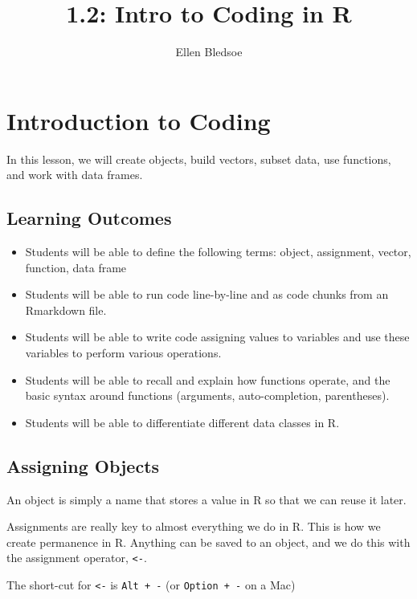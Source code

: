 \documentclass[
  letterpaper,
  DIV=11,
  numbers=noendperiod]{scrartcl}
\title{1.2: Intro to Coding in R}
\author{Ellen Bledsoe}
\date{}
\providecommand{\tightlist}{%
  \setlength{\itemsep}{0pt}\setlength{\parskip}{0pt}}
\begin{document}
\maketitle


\section{Introduction to Coding}\label{introduction-to-coding}

In this lesson, we will create objects, build vectors, subset data, use
functions, and work with data frames.

\subsection{Learning Outcomes}\label{learning-outcomes}

\begin{itemize}
\tightlist
\item
  Students will be able to define the following terms: object,
  assignment, vector, function, data frame
\item
  Students will be able to run code line-by-line and as code chunks from
  an Rmarkdown file.
\item
  Students will be able to write code assigning values to variables and
  use these variables to perform various operations.
\item
  Students will be able to recall and explain how functions operate, and
  the basic syntax around functions (arguments, auto-completion,
  parentheses).
\item
  Students will be able to differentiate different data classes in R.
\end{itemize}

\subsection{Assigning Objects}\label{assigning-objects}

An object is simply a name that stores a value in R so that we can reuse
it later.

Assignments are really key to almost everything we do in R. This is how
we create permanence in R. Anything can be saved to an object, and we do
this with the assignment operator, \texttt{\textless{}-}.

The short-cut for \texttt{\textless{}-} is \texttt{Alt\ +\ -} (or
\texttt{Option\ +\ -} on a Mac)
\end{document}
